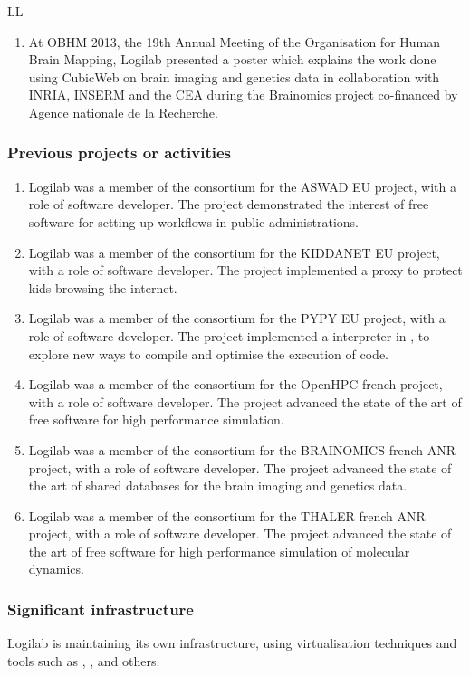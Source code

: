 \begin{sitedescription}{LL}
\begin{enumerate}
 \item At OBHM 2013, the 19th Annual Meeting of the Organisation for Human Brain
   Mapping, Logilab presented a poster which explains the work done using
   CubicWeb on brain imaging and genetics data in collaboration with INRIA,
   INSERM and the CEA during the Brainomics project co-financed by Agence
   nationale de la Recherche.

\end{enumerate}

\subsubsection*{Previous projects or activities}

\begin{enumerate}
\item Logilab was a member of the consortium for the ASWAD EU project, with a
  role of software developer. The project demonstrated the interest of free
  software for setting up workflows in public administrations.
\item Logilab was a member of the consortium for the KIDDANET EU project, with a
  role of software developer. The project implemented a proxy to protect kids
  browsing the internet.
\item Logilab was a member of the consortium for the PYPY EU project, with a
  role of software developer. The project implemented a \Python interpreter in
  \Python, to explore new ways to compile and optimise the execution of \Python
  code.
\item Logilab was a member of the consortium for the OpenHPC french project,
  with a role of software developer. The project advanced the state of the art
  of free software for high performance simulation.
\item Logilab was a member of the consortium for the BRAINOMICS french ANR
  project, with a role of software developer. The project advanced the state of
  the art of shared databases for the brain imaging and genetics data.
\item Logilab was a member of the consortium for the THALER french ANR project,
  with a role of software developer. The project advanced the state of the art
  of free software for high performance simulation of molecular dynamics.
\end{enumerate}

\subsubsection*{Significant infrastructure}

Logilab is maintaining its own infrastructure, using virtualisation techniques
and tools such as , , 
and others.

\end{sitedescription}





